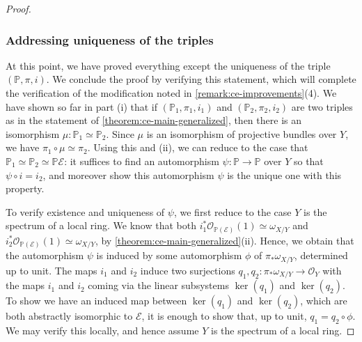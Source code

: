 \documentclass[12 pt]{amsart}
\theoremstyle{plain}
\theoremstyle{definition}
\theoremstyle{remark}
\numberwithin{equation}{section}
\newcommand\bp{\mathbb P}
\newcommand\sce{\mathscr E}
\newcommand\sco{\mathscr O}
\begin{document}
\begin{proof}
\subsubsection*{Addressing uniqueness of the triples}
At this point, we have proved everything except the uniqueness of the triple
$(\mathbb P, \pi, i)$. We conclude the proof by verifying this statement, which
will complete the verification of the modification noted in \autoref{remark:ce-improvements}(4).
We have shown so far in part (i) that if 
$(\mathbb P_1, \pi_1, i_1)$ and
$(\mathbb P_2, \pi_2, i_2)$ are two triples as in the statement of
\autoref{theorem:ce-main-generalized},
then there is an isomorphism $\mu : \mathbb P_1 \simeq \mathbb
P_2$.
Since $\mu$ is an isomorphism of projective bundles over $Y$, we have $\pi_1 \circ
\mu \simeq \pi_2$.
Using this and (ii), we can reduce to the case that $\mathbb P_1 \simeq \mathbb P_2
\simeq \mathbb P \mathscr E$:
it suffices to find an automorphism $\psi: \mathbb P \to \mathbb P$
over $Y$
so that $\psi \circ i = i_2$, and moreover show this automorphism $\psi$ is the
unique one with
this property.

To verify existence and uniqueness of $\psi$, we first reduce to the case $Y$ is the spectrum of a local
	ring.
We know that both $i_1^* \sco_{\bp (\sce)}(1) \simeq \omega_{X/Y}$ and 
$i_2^* \sco_{\bp (\sce)}(1) \simeq \omega_{X/Y}$,
	by \autoref{theorem:ce-main-generalized}(ii).  Hence, we obtain that the
	automorphism $\psi$ is induced by some automorphism $\phi$ of $\pi_*\omega_{X/Y}$,
	determined up to unit.
		The maps $i_1$ and $i_2$ induce two surjections
	$q_1, q_2: \pi_* \omega_{X/Y} \to \sco_Y$ with the maps $i_1$ and $i_2$ 
	coming via the linear subsystems $\ker (q_1)$ and $\ker(q_2)$.
	To show we have an induced map between $\ker(q_1)$ and $\ker(q_2)$,
	which are both abstractly isomorphic to $\sce$, it is enough to show
	that, up to unit, $q_1 = q_2 \circ \phi$.
	We may verify this locally, and hence assume $Y$ is the spectrum of a
	local ring.


\end{proof}
\end{document}
